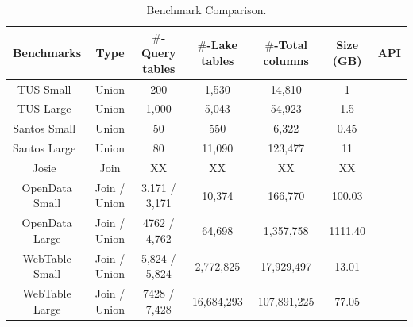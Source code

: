   
  \begin{table}[t]
  	\centering
  	\caption{Benchmark Comparison.}
  	\setlength{\arrayrulewidth}{0.5pt} %
  	\begin{tabular}{|c|c|c|c|c|c|c|}
  		\hline
  		\centering
  		Benchmarks & Type & $\#$-Query tables & $\#$-Lake tables & $\#$-Total columns & Size (GB) &  API \\
  		\hline  
  		TUS Small~\cite{TUS}& Union  & 200 & 1,530 & 14,810 & 1 & \XSolidBrush \\
  		\hline
  		TUS Large~\cite{TUS}& Union  & 1,000 & 5,043 & 54,923 & 1.5 & \XSolidBrush \\
  		\hline
  		Santos Small~\cite{Santos}& Union  & 50 & 550 & 6,322 & 0.45 & \XSolidBrush \\
  		\hline
  		Santos Large~\cite{Santos}& Union  & 80 & 11,090 & 123,477 & 11 & \XSolidBrush  \\
  		\hline
  		Josie~\cite{Josie}& Join  & XX & XX  & XX  & XX &  \XSolidBrush \\
  		\hline
  		\rowcolor{gray!40} 
  		OpenData Small & Join / Union  & 3,171 / 3,171 & 10,374  & 166,770  & 100.03 & \Checkmark  \\
  		\hline
  		\rowcolor{gray!40}
  		OpenData Large & Join / Union  & 4762 / 4,762 & 64,698  & 1,357,758  & 1111.40 & \Checkmark  \\
  		\hline
  		\rowcolor{gray!40}
  		WebTable Small & Join / Union  & 5,824 / 5,824 & 2,772,825  & 17,929,497  & 13.01 & \Checkmark\\
  		\hline
  		\rowcolor{gray!40}
  		WebTable Large & Join / Union  & 7428 / 7,428 & 16,684,293  & 107,891,225  & 77.05 &\Checkmark \\
  		\hline
  	\end{tabular}
  	\label{Table:benchmarks}
  	
  \end{table}
